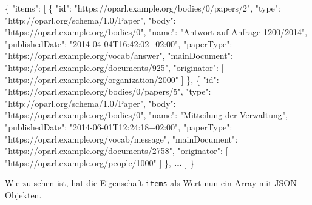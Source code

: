 \documentclass[,a4paper]{article}
\newenvironment{Shaded}{}{}
\newcommand{\DataTypeTok}[1]{\textcolor[rgb]{0.56,0.13,0.00}{{#1}}}
\newcommand{\StringTok}[1]{\textcolor[rgb]{0.25,0.44,0.63}{{#1}}}
\newcommand{\OtherTok}[1]{\textcolor[rgb]{0.00,0.44,0.13}{{#1}}}
\newcommand{\FunctionTok}[1]{\textcolor[rgb]{0.02,0.16,0.49}{{#1}}}
\newcommand{\ErrorTok}[1]{\textcolor[rgb]{1.00,0.00,0.00}{\textbf{{#1}}}}
\begin{document}
\begin{Shaded}
\begin{Highlighting}[]
\FunctionTok{\{}
    \DataTypeTok{"items"}\FunctionTok{:} \OtherTok{[}
        \FunctionTok{\{}
            \DataTypeTok{"id"}\FunctionTok{:} \StringTok{"https://oparl.example.org/bodies/0/papers/2"}\FunctionTok{,}
            \DataTypeTok{"type"}\FunctionTok{:} \StringTok{"http://oparl.org/schema/1.0/Paper"}\FunctionTok{,}
            \DataTypeTok{"body"}\FunctionTok{:} \StringTok{"https://oparl.example.org/bodies/0"}\FunctionTok{,}
            \DataTypeTok{"name"}\FunctionTok{:} \StringTok{"Antwort auf Anfrage 1200/2014"}\FunctionTok{,}
            \DataTypeTok{"publishedDate"}\FunctionTok{:} \StringTok{"2014-04-04T16:42:02+02:00"}\FunctionTok{,}
            \DataTypeTok{"paperType"}\FunctionTok{:} \StringTok{"https://oparl.example.org/vocab/answer"}\FunctionTok{,}
            \DataTypeTok{"mainDocument"}\FunctionTok{:} \StringTok{"https://oparl.example.org/documents/925"}\FunctionTok{,}
            \DataTypeTok{"originator"}\FunctionTok{:} \OtherTok{[}
                \StringTok{"https://oparl.example.org/organization/2000"}
            \OtherTok{]}
        \FunctionTok{\}}\OtherTok{,}
        \FunctionTok{\{}
            \DataTypeTok{"id"}\FunctionTok{:} \StringTok{"https://oparl.example.org/bodies/0/papers/5"}\FunctionTok{,}
            \DataTypeTok{"type"}\FunctionTok{:} \StringTok{"http://oparl.org/schema/1.0/Paper"}\FunctionTok{,}
            \DataTypeTok{"body"}\FunctionTok{:} \StringTok{"https://oparl.example.org/bodies/0"}\FunctionTok{,}
            \DataTypeTok{"name"}\FunctionTok{:} \StringTok{"Mitteilung der Verwaltung"}\FunctionTok{,}
            \DataTypeTok{"publishedDate"}\FunctionTok{:} \StringTok{"2014-06-01T12:24:18+02:00"}\FunctionTok{,}
            \DataTypeTok{"paperType"}\FunctionTok{:} \StringTok{"https://oparl.example.org/vocab/message"}\FunctionTok{,}
            \DataTypeTok{"mainDocument"}\FunctionTok{:} \StringTok{"https://oparl.example.org/documents/2758"}\FunctionTok{,}
            \DataTypeTok{"originator"}\FunctionTok{:} \OtherTok{[}
                \StringTok{"https://oparl.example.org/people/1000"}
            \OtherTok{]}
        \FunctionTok{\}}\OtherTok{,}
        \ErrorTok{...}
    \OtherTok{]}
\FunctionTok{\}}
\end{Highlighting}
\end{Shaded}

Wie zu sehen ist, hat die Eigenschaft \texttt{items} als Wert nun ein
Array mit JSON-Objekten.
\end{document}
